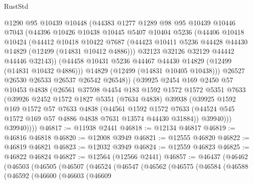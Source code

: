 \begin{lexlean}{RustStd}
\begin{coremodule}
{\begin{coremodule}
{{{{{{{{{{{{{{{{{{{{{{{{{{{{{{{{{{{{{{{{{{{{{{{{{{{{{{{{{{{{{{{{{{{{{{{{{{{{{{{{            @1290
            @95
            @10439
            @10448
            (@44383
              @1277
              @1289
              @98
              @95
              @10439
              @10446
              @7043
              (@44396
                @10426
                @10438
                @10445
                @5407
                @10404
                @5236
                (@44406
                  @10418
                  @10424
                  (@44412
                    @10418
                    @10422
                    @7687
                    (@44423 @10411 @5236 @44428 @44430 @14829 (@12499 (@14831 @10412 @4886)))
                    @32123
                    @32126
                    @32129
                    @44442
                    @44446
                    @32143))
                (@44458 @10431 @5236 @44467 @44430 @14829 (@12499 (@14831 @10432 @4886)))
                @14829
                (@12499 (@14831 @10405 @10438)))
              @26527
              @26530
              @26533
              @26537
              @26542
              @26548))
          (@39925
            @2454
            @169
            @2450
            @57
            @10453
            @4838
            (@26561
              @37598
              @4454
              @183
              @1592
              @1572
              @1572
              @5351
              @7633
              (@39926
                @2452
                @1572
                @1827
                @5351
                (@7634 @4838)
                @39938
                (@39925
                  @1592
                  @169
                  @1572
                  @57
                  @7633
                  @4838
                  (@44561
                    @1592
                    @1572
                    @7633
                    (@44524 @545 @1572 @169 @57 @4886 @4838 @7631 @13574 @44430 @31884))
                  @39940)))
            @39940))))
@46817 := @11938 @2441
@46818 := @12134 @46817
@46819 := @46816 @46818
@46820 := @12008 @3949
@46821 := @12555 @46820
@46822 := @46819 @46821
@46823 := @12032 @3949
@46824 := @12559 @46823
@46825 := @46822 @46824
@46827 := @12564 (@12566 @2441)
@46857 := @46437
    (@46462
      (@46503
        (@46505
          (@46507
            (@46524
              (@46547
                (@46562
                  (@46575
                    (@46584
                      (@46588
                        (@46592
                          (@46600
                            (@46603
                              (@46609
}}}}}}}}}}}}}}}}}}}}}}}}}}}}}}}}}}}}}}}}}}}}}}}}}}}}}}}}}}}}}}}}}}}}}}}}}}}}}}}}
\end{coremodule}}
\end{coremodule}
\end{lexlean}
